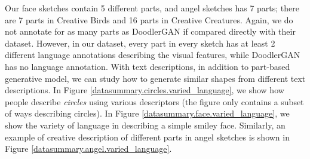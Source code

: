 Our face sketches contain 5 different parts, and angel sketches has 7 parts; there are 7 parts in Creative Birds and 16 parts in Creative Creatures. Again, we do not annotate for as many parts as DoodlerGAN if compared directly with their dataset. 
However, in our dataset, every part in every sketch has at least 2 different language annotations describing the visual features, while DoodlerGAN has no language annotation. 
With text descriptions, in addition to part-based generative model, we can study how to generate similar shapes from different text descriptions. In Figure \ref{datasummary.circles.varied_language}, we show how people describe \textit{circles} using various descriptors (the figure only contains a subset of ways describing circles).  
In Figure \ref{datasummary.face.varied_language}, we show the variety of language in describing a simple smiley face. Similarly, an example of creative description of different parts in angel sketches is shown in Figure \ref{datasummary.angel.varied_language}.  


